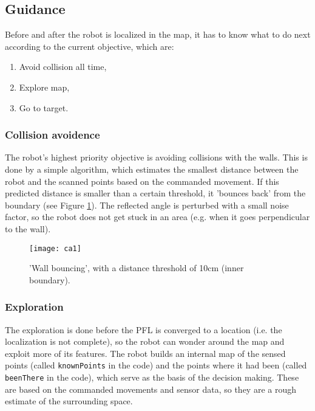 \subsection{Guidance}

	Before and after the robot is localized in the map, it has to know what to do next according to the current objective, which are:
	\begin{enumerate}
		\item Avoid collision all time,
		\item Explore map,
		\item Go to target.
	\end{enumerate}
	
	\subsubsection{Collision avoidence}
	
		The robot's highest priority objective is avoiding collisions with the walls. This is done by a simple algorithm, which estimates the smallest distance between the robot and the scanned points based on the commanded movement. If this predicted distance is smaller than a certain threshold, it 'bounces back' from the boundary (see Figure \ref{fig:ca}). The reflected angle is perturbed with a small noise factor, so the robot does not get stuck in an area (e.g. when it goes perpendicular to the wall).
		
		\begin{figure}[h]
		   \centering
			\texttt{[image: ca1]}
		    
		   \caption{'Wall bouncing', with a distance threshold of 10cm (inner boundary).}
		   \label{fig:ca}
	 	\end{figure}
	
	\subsubsection{Exploration}
	
		The exploration is done before the PFL is converged to a location (i.e. the localization is not complete), so the robot can wonder around the map and exploit more of its features. The robot builds an internal map of the sensed points (called {\tt knownPoints} in the code) and the points where it had been (called {\tt beenThere} in the code), which serve as the basis of the decision making. These are based on the commanded movements and sensor data, so they are a rough estimate of the surrounding space. 
		
